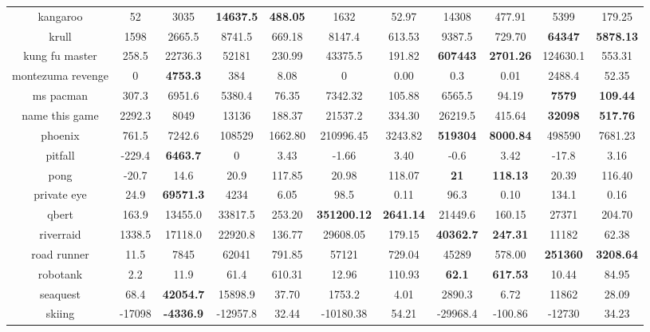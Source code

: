\begin{center}
{\begin{tabular}{ccccccccccc}
 kangaroo   & 52    & 3035 & \textbf{14637.5} & \textbf{488.05} & 1632    & 52.97    & 14308   & 477.91     & 5399 & 179.25 \\
 krull     & 1598   & 2665.5 & 8741.5  & 669.18 & 8147.4  & 613.53   & 9387.5  &  729.70  & \textbf{64347} & \textbf{5878.13} \\
 kung fu master & 258.5 & 22736.3 & 52181 & 230.99 & 43375.5 & 191.82 & \textbf{607443} & \textbf{2701.26}  & 124630.1 & 553.31 \\
 montezuma revenge & 0  & \textbf{4753.3}  & 384   & 8.08   & 0       & 0.00   & 0.3    & 0.01     & 2488.4  & 52.35 \\
 ms pacman  & 307.3 & 6951.6   & 5380.4  & 76.35   & 7342.32 & 105.88 & 6565.5 & 94.19    & \textbf{7579}  & \textbf{109.44} \\
 name this game & 2292.3 & 8049 & 13136 & 188.37   & 21537.2 & 334.30 & 26219.5 & 415.64  & \textbf{32098} & \textbf{517.76} \\
 phoenix & 761.5 & 7242.6  & 108529 & 1662.80   & 210996.45  & 3243.82 & \textbf{519304} & \textbf{8000.84} & 498590 & 7681.23 \\
 pitfall & -229.4 & \textbf{6463.7} & 0      & 3.43      & -1.66      & 3.40    & -0.6   & 3.42    & -17.8 & 3.16 \\
 pong    & -20.7  & 14.6   & 20.9   & 117.85    & 20.98      & 118.07  & \textbf{21}     &  \textbf{118.13} & 20.39  & 116.40 \\
 private eye & 24.9 & \textbf{69571.3} & 4234 & 6.05     & 98.5       & 0.11    & 96.3   & 0.10    & 134.1  & 0.16 \\
 qbert  & 163.9 & 13455.0 & 33817.5  & 253.20   & \textbf{351200.12}  & \textbf{2641.14} & 21449.6 & 160.15 & 27371 & 204.70 \\
 riverraid & 1338.5 & 17118.0 & 22920.8 & 136.77 & 29608.05  & 179.15  & \textbf{40362.7} & \textbf{247.31} & 11182 & 62.38 \\
 road runner & 11.5 & 7845    & 62041   & 791.85 & 57121     & 729.04  & 45289   & 578.00 & \textbf{251360} & \textbf{3208.64} \\
 robotank   & 2.2   & 11.9  & 61.4   & 610.31    & 12.96     & 110.93  & \textbf{62.1}    & \textbf{617.53} & 10.44  & 84.95 \\
 seaquest  & 68.4 & \textbf{42054.7} & 15898.9 & 37.70    & 1753.2    & 4.01    & 2890.3  & 6.72   & 11862  & 28.09 \\
 skiing & -17098  & \textbf{-4336.9} & -12957.8 & 32.44  & -10180.38 & 54.21   & -29968.4 & -100.86 & -12730 & 34.23 \\

\end{tabular}}
\end{center}
